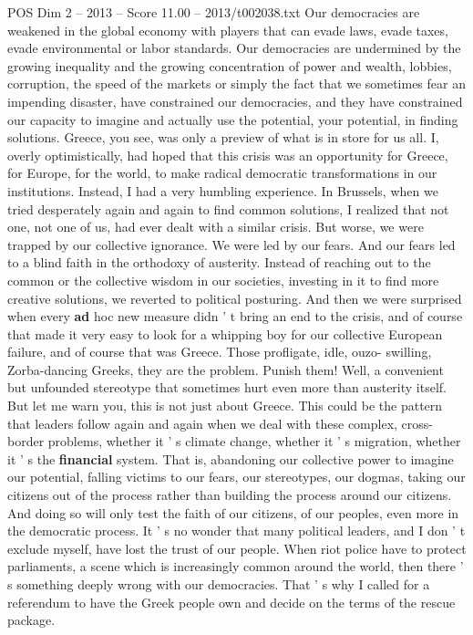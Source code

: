 \begin{textsample}{POS Dim 2 – 2013 – Score 11.00 – 2013/t002038.txt}
Our democracies are weakened in the global economy with players that can evade laws, evade taxes, evade environmental or labor standards.
Our democracies are undermined by the growing inequality and the growing concentration of power and wealth, lobbies, corruption, the speed of the markets or simply the fact that we sometimes fear an impending disaster, have constrained our democracies, and they have constrained our capacity to imagine and actually use the potential, your potential, in finding solutions.
Greece, you see, was only a preview of what is in store for us all.
I, overly optimistically, had hoped that this crisis was an opportunity for Greece, for Europe, for the world, to make radical democratic transformations in our institutions.
Instead, I had a very humbling experience.
In Brussels, when we tried desperately again and again to find common solutions, I realized that not one, not one of us, had ever dealt with a similar crisis.
But worse, we were trapped by our collective ignorance.
We were led by our fears.
And our fears led to a blind faith in the orthodoxy of austerity.
Instead of reaching out to the common or the collective wisdom in our societies, investing in it to find more creative solutions, we reverted to political posturing.
And then we were surprised when every \textbf{ad} hoc new measure didn ' t bring an end to the crisis, and of course that made it very easy to look for a whipping boy for our collective European failure, and of course that was Greece.
Those profligate, idle, ouzo- swilling, Zorba-dancing Greeks, they are the problem.
Punish them!
Well, a convenient but unfounded stereotype that sometimes hurt even more than austerity itself.
But let me warn you, this is not just about Greece.
This could be the pattern that leaders follow again and again when we deal with these complex, cross- border problems, whether it ' s climate change, whether it ' s migration, whether it ' s the \textbf{financial} system.
That is, abandoning our collective power to imagine our potential, falling victims to our fears, our stereotypes, our dogmas, taking our citizens out of the process rather than building the process around our citizens.
And doing so will only test the faith of our citizens, of our peoples, even more in the democratic process.
It ' s no wonder that many political leaders, and I don ' t exclude myself, have lost the trust of our people.
When riot police have to protect parliaments, a scene which is increasingly common around the world, then there ' s something deeply wrong with our democracies.
That ' s why I called for a referendum to have the Greek people own and decide on the terms of the rescue package.

\end{textsample}
